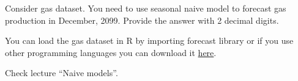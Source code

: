 
\begin{question}
Consider gas dataset. You need to use seasonal naive model to forecast gas production in December, 2099. Provide the answer with 2 decimal digits.

You can load the gas dataset in R by importing forecast library or if you use other programming languages you can download it \href{https://github.com/vincentarelbundock/Rdatasets/blob/master/csv/forecast/gas.csv}{here}.
\end{question}

\begin{solution}
Check lecture ``Naive models''.
\end{solution}

